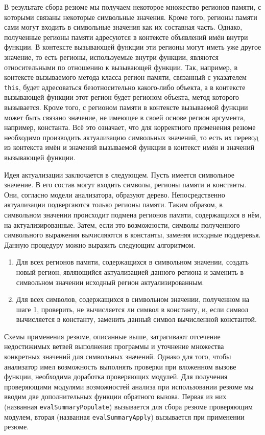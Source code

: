 В результате сбора резюме мы получаем некоторое множество регионов памяти, с которыми связаны некоторые символьные значения. Кроме того, регионы памяти сами могут входить в символьные значения как их составная часть. Однако, полученные регионы памяти адресуются в контексте объявлений имён внутри функции. В контексте вызывающей функции эти регионы могут иметь уже другое значение, то есть регионы, используемые внутри функции, являются относительными по отношению к вызывающей функции. Так, например, в контексте вызываемого метода класса регион памяти, связанный с указателем \texttt{this}, будет адресоваться безотносительно какого-либо объекта, а в контексте вызывающей функции этот регион будет регионом объекта, метод которого вызывается. Кроме того, с регионом памяти в контексте вызываемой функции может быть связано значение, не имеющее в своей основе регион аргумента, например, константа. Всё это означает, что для корректного применения резюме необходимо производить актуализацию символьных значений, то есть их перевод из контекста имён и значений вызываемой функции в контекст имён и значений вызывающей функции.

Идея актуализации заключается в следующем. Пусть имеется символьное значение. В его состав могут входить символы, регионы памяти и константы. Они, согласно модели анализатора, образуют дерево. Непосредственно актуализации подвергаются только регионы памяти. Таким образом, в символьном значении происходит подмена регионов памяти, содержащихся в нём, на актуализированные. Затем, если это возможности, символы полученного символьного выражения вычисляются в константы, заменяя исходные поддеревья. Данную процедуру можно выразить следующим алгоритмом.

\begin{enumerate}
 \item Для всех регионов памяти, содержащихся в символьном значении, создать новый регион, являющийся актуализацией данного региона и заменить в символьном значении исходный регион актуализированным.
 \item Для всех символов, содержащихся в символьном значении, полученном на шаге 1, проверить, не вычисляется ли символ в константу, и, если символ вычисляется в константу, заменить данный символ вычисленной константой.
\end{enumerate}

Схемы применения резюме, описанные выше, затрагивают отсечение недостижимых ветвей выполнения программы и уточнение множества конкретных значений для символьных значений. Однако для того, чтобы анализатор имел возможность выполнять проверки при вложенном вызове функции, необходима доработка проверяющих модулей. Для получения проверяющими модулями возможностей анализа при использовании резюме мы вводим две дополнительных функции обратного вызова. Первая из них (названная \texttt{evalSummaryPopulate}) вызывается для сбора резюме проверяющим модулем, вторая (названная \texttt{evalSummaryApply}) вызывается при применении резюме.

